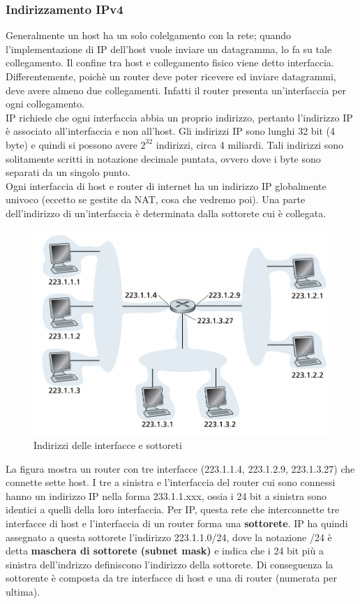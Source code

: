 \documentclass[11pt,a4paper]{article}
\begin{document}
\subsubsection{Indirizzamento IPv4}
Generalmente un host ha un solo colelgamento con la rete; quando l'implementazione di IP dell'host vuole inviare un datagramma, lo fa su tale collegamento. Il confine tra host e collegamento fisico viene detto interfaccia. \\
Differentemente, poichè un router deve poter ricevere ed inviare datagrammi, deve avere almeno due collegamenti. Infatti il router presenta un'interfaccia per ogni collegamento. \\
IP richiede che ogni interfaccia abbia un proprio indirizzo, pertanto l'indirizzo IP è associato all'interfaccia e non all'host. Gli indirizzi IP sono lunghi 32 bit (4 byte) e quindi si possono avere $2^{32}$ indirizzi, circa 4 miliardi. Tali indirizzi sono solitamente scritti in notazione decimale puntata, ovvero dove i byte sono separati da un singolo punto. \\
Ogni interfaccia di host e router di internet ha un indirizzo IP globalmente univoco (eccetto se gestite da NAT, cosa che vedremo poi). Una parte dell'indirizzo di un'interfaccia è determinata dalla sottorete cui è collegata.
\begin{figure}
	\includegraphics[scale=0.5]{img/054.png}
	\caption{Indirizzi delle interfacce e sottoreti}
\end{figure}
La figura mostra un router con tre interfacce (223.1.1.4, 223.1.2.9, 223.1.3.27) che connette sette host. I tre a sinistra e l'interfaccia del router cui sono connessi hanno un indirizzo IP nella forma 233.1.1.xxx, ossia i 24 bit a sinistra sono identici a quelli della loro interfaccia. Per IP, questa rete che interconnette tre interfacce di host e l'interfaccia di un router forma una \textbf{sottorete}. IP ha quindi assegnato a questa sottorete l'indirizzo 223.1.1.0/24, dove la notazione /24 è detta \textbf{maschera di sottorete (subnet mask)} e indica che i 24 bit più a sinistra dell'indrizzo definiscono l'indirizzo della sottorete. Di conseguenza la sottorente è composta da tre interfacce di host e una di router (numerata per ultima). \\
\end{document}

